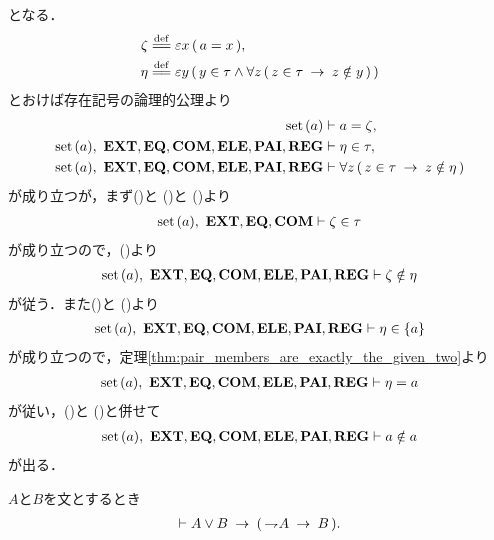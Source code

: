 \begin{sketch}
		となる．
		\begin{align}
			\zeta &\defeq \varepsilon x\, (\, a = x\, ), \\
			\eta &\defeq \varepsilon y\, (\, y \in \tau \wedge \forall z\, (\, 
			z \in \tau \rarrow z \notin y\, )\, )
		\end{align}
		とおけば存在記号の論理的公理より
		\begin{align}
			\operatorname*{set}\hspace{0.15em}(a) &\vdash a = \zeta, \label{fom:no_class_contains_itself_4} \\
			\operatorname*{set}\hspace{0.15em}(a),\ \mbox{{\bf EXT}},\mbox{{\bf EQ}},\mbox{\bf COM},\mbox{{\bf ELE}},\mbox{{\bf PAI}},\mbox{{\bf REG}} &\vdash 
			\eta \in \tau, \label{fom:no_class_contains_itself_5} \\
			\operatorname*{set}\hspace{0.15em}(a),\ \mbox{{\bf EXT}},\mbox{{\bf EQ}},\mbox{\bf COM},\mbox{{\bf ELE}},\mbox{{\bf PAI}},\mbox{{\bf REG}} &\vdash 
			\forall z\, (\, z \in \tau \hspace{0.25em}\rightarrow\hspace{0.25em} z \notin \eta\, )
			\label{fom:no_class_contains_itself_6}
		\end{align}
		が成り立つが，まず()と
		()と
		()より
		\begin{align}
			\operatorname*{set}\hspace{0.15em}(a),\ \mbox{{\bf EXT}},\mbox{{\bf EQ}},\mbox{\bf COM} \vdash \zeta \in \tau
		\end{align}
		が成り立つので，()より
		\begin{align}
			\operatorname*{set}\hspace{0.15em}(a),\ \mbox{{\bf EXT}},\mbox{{\bf EQ}},\mbox{\bf COM},\mbox{{\bf ELE}},\mbox{{\bf PAI}},\mbox{{\bf REG}} \vdash 
			\zeta \notin \eta
			\label{fom:no_class_contains_itself_7}
		\end{align}
		が従う．また()と
		()より
		\begin{align}
			\operatorname*{set}\hspace{0.15em}(a),\ \mbox{{\bf EXT}},\mbox{{\bf EQ}},\mbox{\bf COM},\mbox{{\bf ELE}},\mbox{{\bf PAI}},\mbox{{\bf REG}} \vdash \eta \in \{a\}
		\end{align}
		が成り立つので，定理\ref{thm:pair_members_are_exactly_the_given_two}より
		\begin{align}
			\operatorname*{set}\hspace{0.15em}(a),\ \mbox{{\bf EXT}},\mbox{{\bf EQ}},\mbox{\bf COM},\mbox{{\bf ELE}},\mbox{{\bf PAI}},\mbox{{\bf REG}} \vdash \eta = a
		\end{align}
		が従い，()と
		()と併せて
		\begin{align}
			\operatorname*{set}\hspace{0.15em}(a),\ \mbox{{\bf EXT}},\mbox{{\bf EQ}},\mbox{\bf COM},\mbox{{\bf ELE}},\mbox{{\bf PAI}},\mbox{{\bf REG}} \vdash a \notin a
		\end{align}
		が出る．
		\QED
	\end{sketch}
	
	\begin{screen}
		\begin{logicalthm}[選言三段論法]
		\label{logicalthm:disjunctive_syllogism}
			$A$と$B$を文とするとき
			\begin{align}
				\vdash A \vee B \hspace{0.25em}\rightarrow\hspace{0.25em} (\, \rightharpoondown\hspace{-0.25em} A \hspace{0.25em}\rightarrow\hspace{0.25em} B\, ).
			\end{align}
		\end{logicalthm}
	\end{screen}
	

